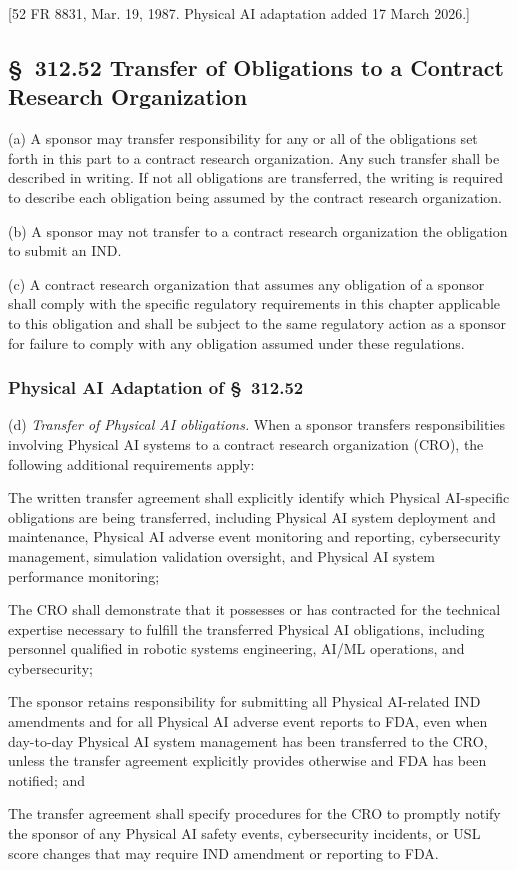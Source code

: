 [52 FR 8831, Mar. 19, 1987. Physical AI adaptation added 17 March 2026.]

\subsection{\S~312.52 Transfer of Obligations to a Contract Research Organization}

(a) A sponsor may transfer responsibility for any or all of the obligations set forth in this part to a contract research organization. Any such transfer shall be described in writing. If not all obligations are transferred, the writing is required to describe each obligation being assumed by the contract research organization.

(b) A sponsor may not transfer to a contract research organization the obligation to submit an IND.

(c) A contract research organization that assumes any obligation of a sponsor shall comply with the specific regulatory requirements in this chapter applicable to this obligation and shall be subject to the same regulatory action as a sponsor for failure to comply with any obligation assumed under these regulations.

\subsubsection{Physical AI Adaptation of \S~312.52}

(d) \textit{Transfer of Physical AI obligations.} When a sponsor transfers responsibilities involving Physical AI systems to a contract research organization (CRO), the following additional requirements apply:

\begin{description}[leftmargin=0.8cm,style=sameline]
\item[(i)] The written transfer agreement shall explicitly identify which Physical AI-specific obligations are being transferred, including Physical AI system deployment and maintenance, Physical AI adverse event monitoring and reporting, cybersecurity management, simulation validation oversight, and Physical AI system performance monitoring;
\item[(ii)] The CRO shall demonstrate that it possesses or has contracted for the technical expertise necessary to fulfill the transferred Physical AI obligations, including personnel qualified in robotic systems engineering, AI/ML operations, and cybersecurity;
\item[(iii)] The sponsor retains responsibility for submitting all Physical AI-related IND amendments and for all Physical AI adverse event reports to FDA, even when day-to-day Physical AI system management has been transferred to the CRO, unless the transfer agreement explicitly provides otherwise and FDA has been notified; and
\item[(iv)] The transfer agreement shall specify procedures for the CRO to promptly notify the sponsor of any Physical AI safety events, cybersecurity incidents, or USL score changes that may require IND amendment or reporting to FDA.
\end{description}

